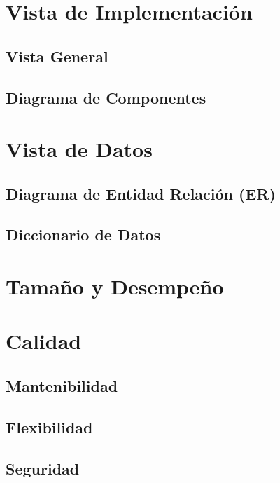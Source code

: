 \documentclass{article}
\begin{document}
    \section{Vista de Implementación} \label{vistaImplementacion}
    \subsection{Vista General}
    \subsection{Diagrama de Componentes}


    \section{Vista de Datos} \label{vistaDatos}
    \subsection{Diagrama de Entidad Relación (ER)}
    \subsection{Diccionario de Datos}


    \section{Tamaño y Desempeño} \label{tamDesemp}

    \section{Calidad}
    \subsection{Mantenibilidad}
    \subsection{Flexibilidad}
    \subsection{Seguridad}
\end{document}
